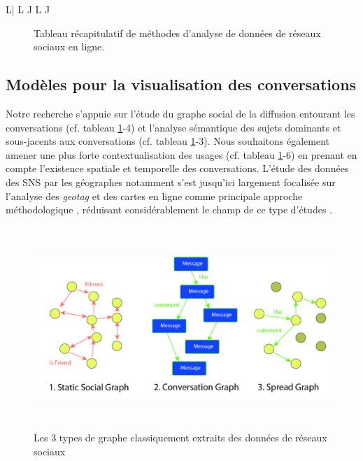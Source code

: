 \begin{landscape}
{\begin{spacing}{1}
\begin{ltabulary}{L| L J L J}
    \end{ltabulary}
    \end{spacing} %
    \begin{figure}
        \caption[Tableau récapitulatif de méthodes d{\textquoteright}analyse de données de réseaux sociaux en ligne.]{Tableau récapitulatif de méthodes d{\textquoteright}analyse de données de réseaux sociaux en ligne.}
        \label{tab:sna}
    \end{figure}
}
\end{landscape}

\subsection[Modèles pour la visualisation des conversations]{Modèles pour la visualisation des conversations}

Notre recherche s'appuie sur l{\textquoteright}étude du graphe social de la diffusion entourant les conversations (cf. tableau \ref{tab:sna}-4) et l{\textquoteright}analyse sémantique des sujets dominants et sous-jacents aux conversations (cf. tableau \ref{tab:sna}-3). Nous souhaitons également amener une plus forte contextualisation des usages (cf. tableau \ref{tab:sna}-6) en prenant en compte l{\textquoteright}existence spatiale et temporelle des conversations. L'étude des données des SNS par les géographes notamment s{\textquoteright}est jusqu{\textquoteright}ici largement focalisée sur l{\textquoteright}analyse des \textit{geotag} et des cartes en ligne comme principale approche méthodologique \citep{Graham2011, Poorthuis2013}, réduisant considérablement le champ de ce type d'études \citep{Crampton2013}.

\begin{figure}[htbp]
    \centering
    \includegraphics[width=6.2894in,height=3.0004in]{figures/chap3/chapitre3-img9.jpg}
    \caption[3 modèles de réseau]{Les 3 types de graphe classiquement extraits des données de réseaux sociaux}
\end{figure}

